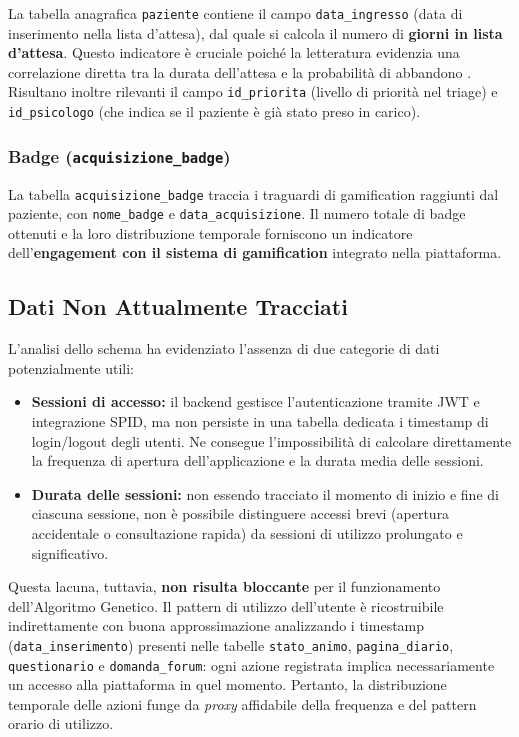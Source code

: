 La tabella anagrafica \texttt{paziente} contiene il campo \texttt{data\_ingresso} (data di inserimento nella lista d'attesa), dal quale si calcola il numero di \textbf{giorni in lista d'attesa}. Questo indicatore è cruciale poiché la letteratura evidenzia una correlazione diretta tra la durata dell'attesa e la probabilità di abbandono \cite{baumel2019mhealth}. Risultano inoltre rilevanti il campo \texttt{id\_priorita} (livello di priorità nel triage) e \texttt{id\_psicologo} (che indica se il paziente è già stato preso in carico).

\subsubsection{Badge (\texttt{acquisizione\_badge})}

La tabella \texttt{acquisizione\_badge} traccia i traguardi di gamification raggiunti dal paziente, con \texttt{nome\_badge} e \texttt{data\_acquisizione}. Il numero totale di badge ottenuti e la loro distribuzione temporale forniscono un indicatore dell'\textbf{engagement con il sistema di gamification} integrato nella piattaforma.

\subsection{Dati Non Attualmente Tracciati}
\label{subsec:dati_mancanti_churn}

L'analisi dello schema ha evidenziato l'assenza di due categorie di dati potenzialmente utili:

\begin{itemize}
    \item \textbf{Sessioni di accesso:} il backend gestisce l'autenticazione tramite JWT e integrazione SPID, ma non persiste in una tabella dedicata i timestamp di login/logout degli utenti. Ne consegue l'impossibilità di calcolare direttamente la frequenza di apertura dell'applicazione e la durata media delle sessioni.
    \item \textbf{Durata delle sessioni:} non essendo tracciato il momento di inizio e fine di ciascuna sessione, non è possibile distinguere accessi brevi (apertura accidentale o consultazione rapida) da sessioni di utilizzo prolungato e significativo.
\end{itemize}

Questa lacuna, tuttavia, \textbf{non risulta bloccante} per il funzionamento dell'Algoritmo Genetico. Il pattern di utilizzo dell'utente è ricostruibile indirettamente con buona approssimazione analizzando i timestamp (\texttt{data\_inserimento}) presenti nelle tabelle \texttt{stato\_animo}, \texttt{pagina\_diario}, \texttt{questionario} e \texttt{domanda\_forum}: ogni azione registrata implica necessariamente un accesso alla piattaforma in quel momento. Pertanto, la distribuzione temporale delle azioni funge da \textit{proxy} affidabile della frequenza e del pattern orario di utilizzo.
